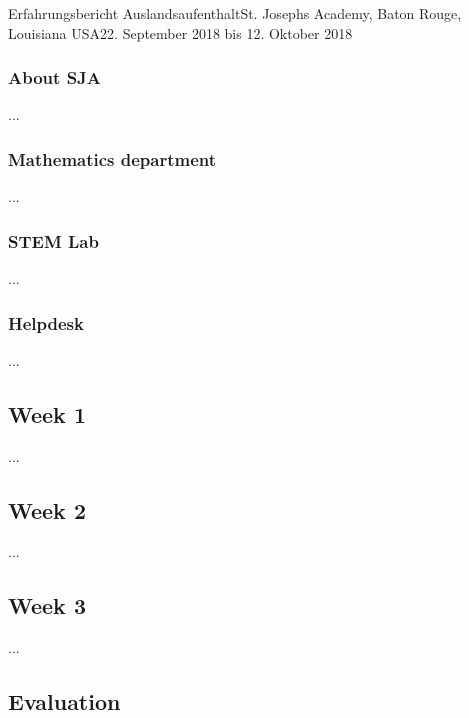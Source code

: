 \documentclass[oneside,openany,headings=optiontotoc,11pt,numbers=noenddot]{article}
\begin{document}
\begin{worksheet}{Erfahrungsbericht Auslandsaufenthalt}{St. Joseph\grq{}s Academy, Baton Rouge, Louisiana USA}{22. September 2018 bis 12. Oktober 2018}
		\subsubsection{About SJA}
		...
		\subsubsection{Mathematics department}
		...
		\subsubsection{STEM Lab}
		...
		\subsubsection{Helpdesk}
		...
		\subsection{Week 1}
		...
		\subsection{Week 2}
		...
		\subsection{Week 3}
		...
		\subsection{Evaluation}
	\end{worksheet}
\end{document}
